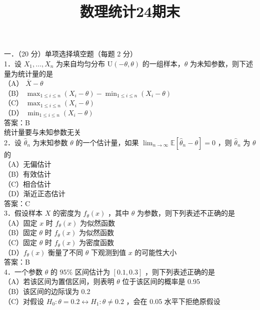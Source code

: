 \documentclass[UTF8]{ctexart}
\title{数理统计24期末}
\author{}
\date{}
\begin{document}
\maketitle
\noindent 一．（20 分）单项选择填空题（每题 2 分）\\
1．设 $X_1, \ldots, X_n$ 为来自均匀分布 $\mathrm{U}(-\theta, \theta)$ 的一组样本，$\theta$ 为未知参数，则下述量为统计量的是\underline{\hspace{2cm}}\\
（A） $\overline{X}-\theta$\\
（B） $\max _{1 \leq i \leq n}\left(X_i-\theta\right)-\min _{1 \leq i \leq n}\left(X_i-\theta\right)$\\
（C） $\max _{1 \leq i \leq n}\left(X_i-\theta\right)$\\
（D） $\min _{1 \leq i \leq n}\left(X_i-\theta\right)$\\
答案：B\\
统计量要与未知参数无关\\
2．设 $\hat{\theta}_n$ 为末知参数 $\theta$ 的一个估计量，如果 $\lim _{n \rightarrow \infty} \mathbb{E}\left[ \hat{\theta}_n-\theta\right] =0$ ，则 $\hat{\theta}_n$ 为 $\theta$ 的\underline{\hspace{2cm}}\\
（A）无偏估计\\
（B）有效估计\\
（C）相合估计\\
（D）渐近正态估计\\
答案：C\\
3．假设样本 $X$ 的密度为 $f_\theta(x)$ ，其中 $\theta$ 为参数，则下列表述不正确的是\underline{\hspace{2cm}}\\
（A）固定 $x$ 时 $f_\theta(x)$ 为似然函数\\
（B）固定 $\theta$ 时 $f_\theta(x)$ 为似然函数\\
（C）固定 $\theta$ 时 $f_\theta(x)$ 为密度函数\\
（D）$f_\theta(x)$ 衡量了不同 $\theta$ 下观测到值 $x$ 的可能性大小\\
答案：B\\
4．一个参数 $\theta$ 的 $95 \%$ 区间估计为 $[0.1,0.3]$ ，则下列表述正确的是\underline{\hspace{2cm}}\\
（A）若该区间为置信区间，则表明 $\theta$ 位于该区间的概率是 0.95\\
（B）该区间的边际误为 0.2\\
（C）对假设 $H_0: \theta=0.2 \leftrightarrow H_1: \theta \neq 0.2$ ，会在 0.05 水平下拒绝原假设\\
\end{document}
